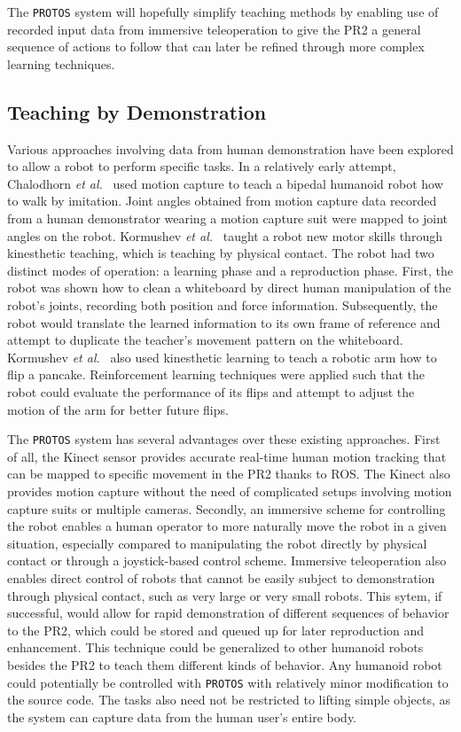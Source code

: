 \documentclass{sig-alternate}
\begin{document}
\indent The {\tt PROTOS} system will hopefully simplify teaching methods by enabling use of recorded input data from immersive teleoperation to give the PR2 
a general sequence of actions  to follow that can later be refined through more complex learning techniques.

\subsection{Teaching by Demonstration}
\label{sec:demo_teach}
\indent Various approaches involving data from human demonstration have been explored to allow a robot to perform specific tasks. In a relatively early attempt, 
Chalodhorn \textit{et al.}~\cite{walk_imitation} used motion capture to teach a bipedal humanoid robot how to walk by imitation. Joint angles obtained from motion capture 
data recorded from a human demonstrator wearing a motion capture suit were mapped to joint angles on the robot.
Kormushev \textit{et al.}~\cite{whiteboard} taught a robot new motor skills through kinesthetic teaching, which is 
teaching by physical contact. The robot had two distinct modes of operation: a learning phase and a reproduction phase. First, the robot was shown how to clean a whiteboard 
by direct human manipulation of the robot's joints, recording both position and force information. Subsequently, the robot would translate the learned information to its own 
frame of reference and attempt to duplicate the teacher's movement pattern on the whiteboard.  Kormushev \textit{et al.}~\cite{pancakes} also used kinesthetic learning to 
teach a robotic arm how to flip a pancake. 
Reinforcement learning techniques were applied such that the robot could evaluate the performance of its flips and attempt to adjust the motion 
of the arm for better future flips.

\indent The {\tt PROTOS} system has several advantages over these existing approaches. First of all, the Kinect sensor provides accurate real-time human
motion tracking that can be mapped to specific movement in the PR2 thanks to ROS. The Kinect also provides motion capture without the need
of complicated setups involving motion capture suits or multiple cameras. Secondly, an immersive scheme for controlling the robot
enables a human operator to more naturally move the robot in a given situation,
especially compared to manipulating the robot directly by physical
contact or through a joystick-based control scheme. Immersive teleoperation also enables direct control of robots that cannot be easily
subject to demonstration through physical contact, such as very large or very small robots. This sytem, if successful, would allow for rapid demonstration of different 
sequences of behavior to the PR2, which could be stored and queued up for later reproduction and enhancement. This technique could be generalized to other humanoid robots 
besides the PR2 to teach them different kinds of behavior. Any humanoid robot could potentially be controlled with {\tt PROTOS} with relatively minor modification to the source code.
The tasks also need not be restricted to lifting simple objects, as the system can capture data from the human user's entire body.
\end{document}
